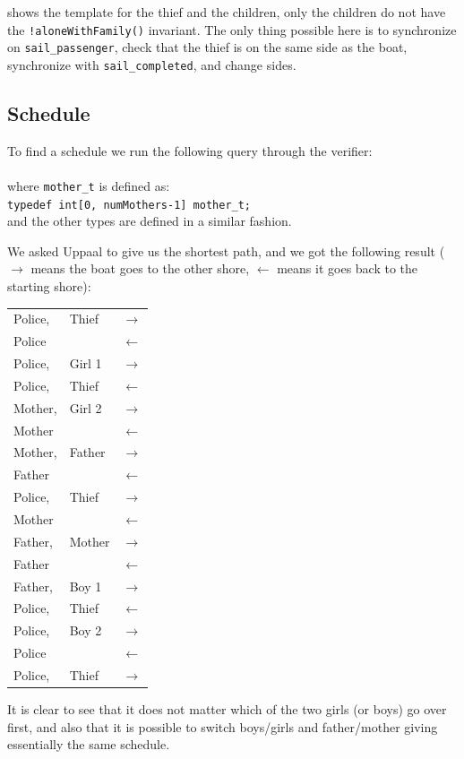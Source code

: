\noindent {} shows the template for the thief and the children, only the children do not have the \texttt{!aloneWithFamily()} invariant. The only thing possible here is to synchronize on \texttt{sail_passenger}, check that the thief is on the same side as the boat, synchronize with \texttt{sail_completed}, and change sides.

\subsection{Schedule}
To find a schedule we run the following query through the verifier:\\

\\

\noindent where \texttt{mother_t} is defined as:\\

\texttt{typedef int[0, numMothers-1] mother_t;}\\

\noindent and the other types are defined in a similar fashion.

We asked Uppaal to give us the shortest path, and we got the following result ($\rightarrow$ means the boat goes to the other shore, $\leftarrow$ means it goes back to the starting shore):

\begin{table}[h]
\begin{tabular}{lll}
Police, & Thief & $\rightarrow$ \\
Police & & $\leftarrow$ \\
Police, & Girl 1 & $\rightarrow$ \\
Police, & Thief & $\leftarrow$ \\
Mother, & Girl 2 & $\rightarrow$ \\
Mother &  & $\leftarrow$ \\
Mother, & Father & $\rightarrow$ \\
Father & & $\leftarrow$ \\
Police, & Thief & $\rightarrow$ \\
Mother & & $\leftarrow$ \\
Father, & Mother & $\rightarrow$ \\
Father & & $\leftarrow$ \\
Father, & Boy 1& $\rightarrow$ \\
Police, &  Thief & $\leftarrow$ \\
Police, & Boy 2 & $\rightarrow$ \\
Police & & $\leftarrow$ \\
Police, & Thief & $\rightarrow$ \\
\end{tabular}
\end{table}

\noindent It is clear to see that it does not matter which of the two girls (or boys) go over first, and also that it is possible to switch boys/girls and father/mother giving essentially the same schedule.
